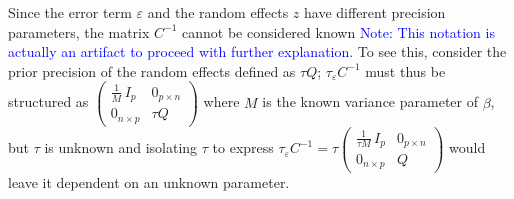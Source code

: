 \documentclass[openany]{book}
\begin{document}
Since the error term $\varepsilon$ and the random effects $z$ have different precision parameters, the matrix $C^{-1}$ cannot be considered known \textcolor{blue}{Note: This notation is actually an artifact to proceed with further explanation}. To see this, consider the prior precision of the random effects defined as $\tau Q$; $\tau_{\varepsilon} C^{-1}$ must thus be structured as $\begin{pmatrix} \frac{1}{M} \, I_p & 0_{p \times n} \\ 0_{n \times p} & \tau Q \end{pmatrix}$ where $M$ is the known variance parameter of $\beta$, but $\tau$ is unknown and isolating $\tau$ to express $\tau_{\varepsilon} C^{-1} = \tau \begin{pmatrix}
 \frac{1}{\tau M} \, I_p & 0_{p \times n} \\ 0_{n \times p} & Q
\end{pmatrix}$ would leave it dependent on an unknown parameter. \\
\end{document}
